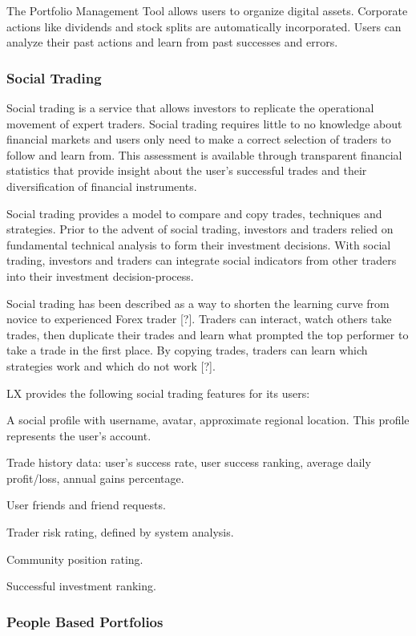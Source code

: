 \documentclass[11pt]{article}
\begin{document}
The Portfolio Management Tool allows users to organize digital assets. Corporate actions like dividends and stock splits are automatically incorporated. Users can analyze their past actions and learn from past successes and errors.


\subsubsection{Social Trading}

Social trading is a service that allows investors to replicate the operational movement of expert traders. Social trading requires little to no knowledge about financial markets and users only need to make a correct selection of traders to follow and learn from. This assessment is available through transparent financial statistics that provide insight about the user's successful trades and their diversification of financial instruments.


Social trading provides a model to compare and copy trades, techniques and strategies. Prior to the advent of social trading, investors and traders relied on fundamental technical analysis to form their investment decisions. With social trading, investors and traders can integrate social indicators from other traders into their investment decision-process.


Social trading has been described as a way to shorten the learning curve from novice to experienced Forex trader [?]. Traders can interact, watch others take trades, then duplicate their trades and learn what prompted the top performer to take a trade in the first place. By copying trades, traders can learn which strategies work and which do not work [?].


LX provides the following social trading features for its users:


A social profile with username, avatar, approximate regional location. This profile represents the user's account.


Trade history data: user's success rate, user success ranking, average daily profit/loss, annual gains percentage.


User friends and friend requests.


Trader risk rating, defined by system analysis.


Community position rating.


Successful investment ranking.


\subsubsection{People Based Portfolios}
\end{document}
